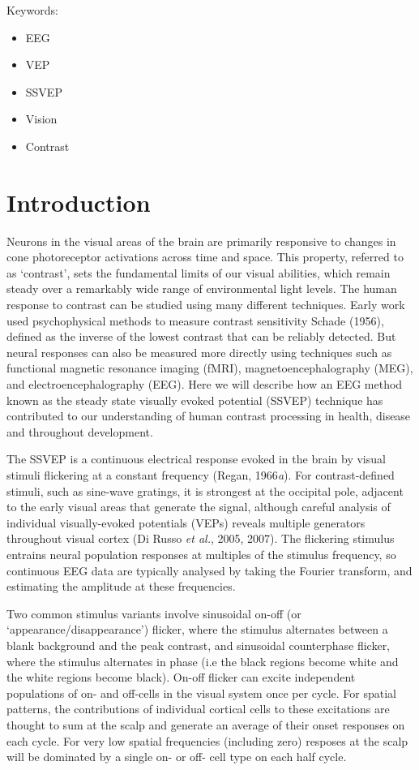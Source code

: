 \documentclass[
  letterpaper,
  DIV=11,
  numbers=noendperiod]{scrartcl}
\providecommand{\tightlist}{%
  \setlength{\itemsep}{0pt}\setlength{\parskip}{0pt}}\usepackage{longtable,booktabs,array}
\begin{document}
Keywords:

\begin{itemize}
\tightlist
\item
  EEG
\item
  VEP
\item
  SSVEP
\item
  Vision
\item
  Contrast
\end{itemize}

\newpage{}

\section{Introduction}\label{introduction}

Neurons in the visual areas of the brain are primarily responsive to
changes in cone photoreceptor activations across time and space. This
property, referred to as `contrast', sets the fundamental limits of our
visual abilities, which remain steady over a remarkably wide range of
environmental light levels. The human response to contrast can be
studied using many different techniques. Early work used psychophysical
methods to measure contrast sensitivity Schade (1956), defined as the
inverse of the lowest contrast that can be reliably detected. But neural
responses can also be measured more directly using techniques such as
functional magnetic resonance imaging (fMRI), magnetoencephalography
(MEG), and electroencephalography (EEG). Here we will describe how an
EEG method known as the steady state visually evoked potential (SSVEP)
technique has contributed to our understanding of human contrast
processing in health, disease and throughout development.

The SSVEP is a continuous electrical response evoked in the brain by
visual stimuli flickering at a constant frequency (Regan, 1966\emph{a}).
For contrast-defined stimuli, such as sine-wave gratings, it is
strongest at the occipital pole, adjacent to the early visual areas that
generate the signal, although careful analysis of individual
visually-evoked potentials (VEPs) reveals multiple generators throughout
visual cortex (Di Russo \emph{et al.}, 2005, 2007). The flickering
stimulus entrains neural population responses at multiples of the
stimulus frequency, so continuous EEG data are typically analysed by
taking the Fourier transform, and estimating the amplitude at these
frequencies.

Two common stimulus variants involve sinusoidal on-off (or
`appearance/disappearance') flicker, where the stimulus alternates
between a blank background and the peak contrast, and sinusoidal
counterphase flicker, where the stimulus alternates in phase (i.e the
black regions become white and the white regions become black). On-off
flicker can excite independent populations of on- and off-cells in the
visual system once per cycle. For spatial patterns, the contributions of
individual cortical cells to these excitations are thought to sum at the
scalp and generate an average of their onset responses on each cycle.
For very low spatial frequencies (including zero) resposes at the scalp
will be dominated by a single on- or off- cell type on each half cycle.
\end{document}
